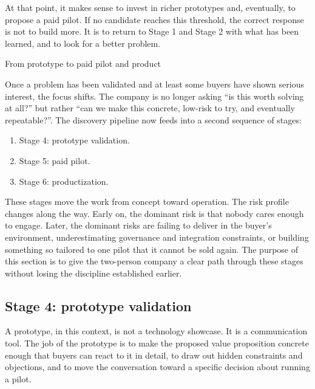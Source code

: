 \documentclass[10pt, a4paper, twocolumn]{article} %
\makeatletter
\let\orig@section\section %
\renewcommand{\section}{%
  \@ifstar{\orig@section*}{\unnumberedsteppingsection}%
}
\newcommand{\unnumberedsteppingsection}[1]{%
  \refstepcounter{section}%
  \orig@section*{#1}%
}
\makeatother
\begin{document}
At that point, it makes sense to invest in richer prototypes and, eventually, to propose a paid pilot. If no candidate reaches this threshold, the correct response is not to build more. It is to return to Stage 1 and Stage 2 with what has been learned, and to look for a better problem.







\section{From prototype to paid pilot and product}

Once a problem has been validated and at least some buyers have shown serious interest, the focus shifts. The company is no longer asking “is this worth solving at all?” but rather “can we make this concrete, low-risk to try, and eventually repeatable?”. The discovery pipeline now feeds into a second sequence of stages:

\begin{enumerate}
  \item Stage 4: prototype validation.
  \item Stage 5: paid pilot.
  \item Stage 6: productization.
\end{enumerate}

These stages move the work from concept toward operation. The risk profile changes along the way. Early on, the dominant risk is that nobody cares enough to engage. Later, the dominant risks are failing to deliver in the buyer’s environment, underestimating governance and integration constraints, or building something so tailored to one pilot that it cannot be sold again. The purpose of this section is to give the two-person company a clear path through these stages without losing the discipline established earlier.

\subsection{Stage 4: prototype validation}

A prototype, in this context, is not a technology showcase. It is a communication tool. The job of the prototype is to make the proposed value proposition concrete enough that buyers can react to it in detail, to draw out hidden constraints and objections, and to move the conversation toward a specific decision about running a pilot.
\end{document}
